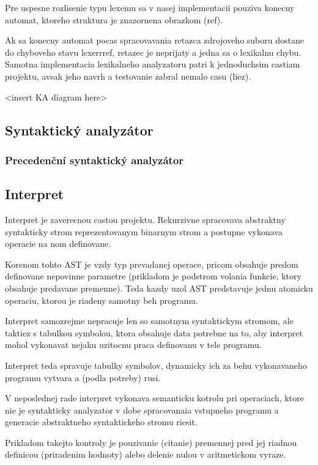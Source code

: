 \documentclass[12pt,a4paper,titlepage,final]{article}
\begin{document}
Pre uspesne rozlisenie typu lexemu sa v nasej implementacii pouziva konecny
automat, ktoreho struktura je znazornena obrazkom (ref).

Ak sa konecny automat pocas spracovavania retazca zdrojoveho suboru dostane do
chyboveho stavu lexerrref, retazec je neprijaty a jedna sa o lexikalnu
chybu. Samotna implementacia lexikalneho analyzatoru patri k jednoduchsim
castiam projektu, avsak jeho navrh a testovanie zabral nemalo casu (liez).

<insert KA diagram here>


\subsection{Syntaktický analyzátor} \label{syntakticky_analyzator}
\subsubsection{Precedenční syntaktický analyzátor} \label{precedencni_syntakticky_analyzator}
\subsection{Interpret} \label{interpret}

Interpret je zaverecnou castou projektu. Rekurzivne spracovava abstraktny
syntakticky strom reprezentovanym binarnym strom a postupne vykonava operacie
na nom definovane.

Korenom tohto AST je vzdy typ prevadanej operace, pricom obsahuje predom
definovane nepovinne parametre (prikladom je podstrom volania funkcie, ktory
obsahuje predavane premenne). Teda kazdy uzol AST predstavuje jednu atomicku
operaciu, ktorou je riadeny samotny beh programu.

Interpret samozrejme nepracuje len so samotnym syntaktickym stromom, ale
taktiez s tabulkou symbolou, ktora obsahuje data potrebne na to, aby interpret
mohol vykonavat nejaku uzitocnu praca definovanu v tele programu.

Interpret teda spravuje tabulky symbolov, dynamicky ich za behu
vykonavaneho programu vytvara a (podla potreby) rusi.

V neposlednej rade interpret vykonava semanticku kotrolu pri operaciach, ktore
nie je syntakticky analyzator v dobe spracovanaia vstupneho programu a generacie
abstraktneho syntaktickeho stromu riesit.

Prikladom takejto kontroly je pouzivanie (citanie) premennej pred jej riadnou
definicou (priradenim hodnoty) alebo delenie nulou v aritmetickom vyraze.
\end{document}
